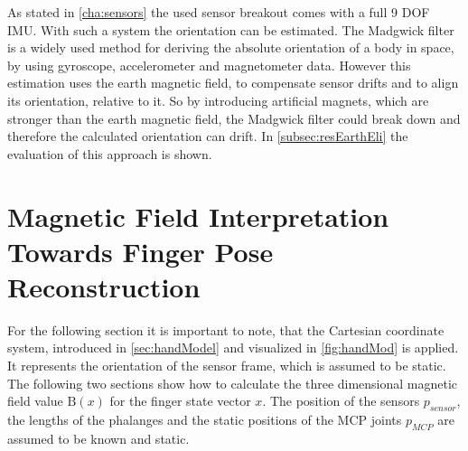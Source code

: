 As stated in \ref{cha:sensors} the used sensor breakout comes with a full 9 \ac{DOF} \ac{IMU}. With such a system the orientation can be estimated. The Madgwick filter \cite{madgwick2010efficient} is a widely used method for deriving the absolute orientation of a body in space, by using gyroscope, accelerometer and magnetometer data. However this estimation uses the earth magnetic field, to compensate sensor drifts and to align its orientation, relative to it. So by introducing artificial magnets, which are stronger than the earth magnetic field, the Madgwick filter could break down and therefore the calculated orientation can drift. In \ref{subsec:resEarthEli} the evaluation of this approach is shown. 


\section{Magnetic Field Interpretation Towards Finger Pose Reconstruction} \label{sec:magmodel}

For the following section it is important to note, that the Cartesian coordinate system, introduced in \ref{sec:handModel} and visualized in \ref{fig:handMod} is applied. It represents the orientation of the sensor frame, which is assumed to be static. The following two sections show how to calculate the three dimensional magnetic field value $ \mathrm{B}(x) $ for the finger state vector $ x $. The position of the sensors $ p_{sensor} $, the lengths of the phalanges and the static positions of the \ac{MCP} joints $ p_{MCP} $ are assumed to be known and static.

